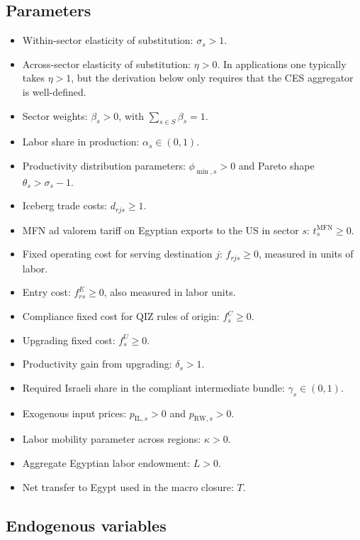 \documentclass[11pt]{article}
\begin{document}
\subsection{Parameters}

\begin{itemize}[leftmargin=*]
    \item Within-sector elasticity of substitution: \(\sigma_s>1\).
    \item Across-sector elasticity of substitution: \(\eta>0\). In applications one typically takes \(\eta>1\), but the derivation below only requires that the CES aggregator is well-defined.
    \item Sector weights: \(\beta_s>0\), with \(\sum_{s\in S}\beta_s=1\).
    \item Labor share in production: \(\alpha_s\in(0,1)\).
    \item Productivity distribution parameters: \(\phi_{\min,s}>0\) and Pareto shape \(\theta_s>\sigma_s-1\).
    \item Iceberg trade costs: \(d_{rjs}\ge 1\).
    \item MFN ad valorem tariff on Egyptian exports to the US in sector \(s\): \(t_s^{\mathrm{MFN}}\ge 0\).
    \item Fixed operating cost for serving destination \(j\): \(f_{rjs}\ge 0\), measured in units of labor.
    \item Entry cost: \(f^E_{rs}\ge 0\), also measured in labor units.
    \item Compliance fixed cost for QIZ rules of origin: \(f_s^C\ge 0\).
    \item Upgrading fixed cost: \(f_s^U\ge 0\).
    \item Productivity gain from upgrading: \(\delta_s>1\).
    \item Required Israeli share in the compliant intermediate bundle: \(\gamma_s\in(0,1)\).
    \item Exogenous input prices: \(p_{\mathrm{IL},s}>0\) and \(p_{\mathrm{RW},s}>0\).
    \item Labor mobility parameter across regions: \(\kappa>0\).
    \item Aggregate Egyptian labor endowment: \(L>0\).
    \item Net transfer to Egypt used in the macro closure: \(T\).
\end{itemize}

\subsection{Endogenous variables}
\end{document}
